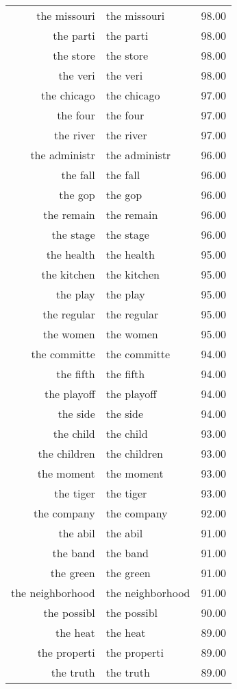 \begin{table}[ht]
\begin{tabular}{rlr}
  the missouri & the missouri & 98.00 \\ 
  the parti & the parti & 98.00 \\ 
  the store & the store & 98.00 \\ 
  the veri & the veri & 98.00 \\ 
  the chicago & the chicago & 97.00 \\ 
  the four & the four & 97.00 \\ 
  the river & the river & 97.00 \\ 
  the administr & the administr & 96.00 \\ 
  the fall & the fall & 96.00 \\ 
  the gop & the gop & 96.00 \\ 
  the remain & the remain & 96.00 \\ 
  the stage & the stage & 96.00 \\ 
  the health & the health & 95.00 \\ 
  the kitchen & the kitchen & 95.00 \\ 
  the play & the play & 95.00 \\ 
  the regular & the regular & 95.00 \\ 
  the women & the women & 95.00 \\ 
  the committe & the committe & 94.00 \\ 
  the fifth & the fifth & 94.00 \\ 
  the playoff & the playoff & 94.00 \\ 
  the side & the side & 94.00 \\ 
  the child & the child & 93.00 \\ 
  the children & the children & 93.00 \\ 
  the moment & the moment & 93.00 \\ 
  the tiger & the tiger & 93.00 \\ 
  the company & the company & 92.00 \\ 
  the abil & the abil & 91.00 \\ 
  the band & the band & 91.00 \\ 
  the green & the green & 91.00 \\ 
  the neighborhood & the neighborhood & 91.00 \\ 
  the possibl & the possibl & 90.00 \\ 
  the heat & the heat & 89.00 \\ 
  the properti & the properti & 89.00 \\ 
  the truth & the truth & 89.00 \\ 

\end{tabular}
\end{table}
